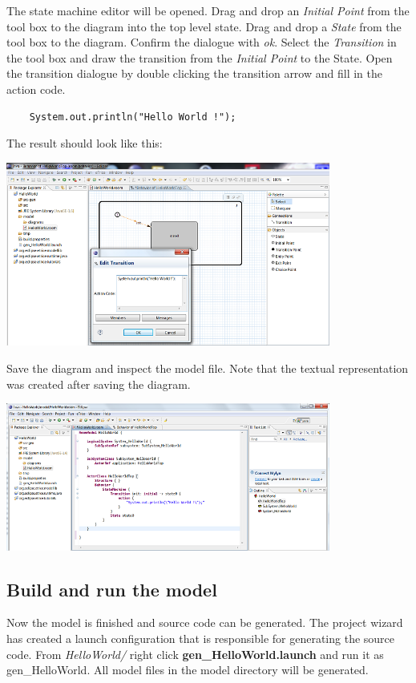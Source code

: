 The state machine editor will be opened. Drag and drop an \textit{Initial Point} from the tool box to the 
diagram into the top level state. Drag and drop a \textit{State} from the tool box to the diagram. Confirm 
the dialogue with \textit{ok}. Select the \textit{Transition} in the tool box and draw the transition from 
the \textit{Initial Point} to the State. Open the transition dialogue by double clicking the transition 
arrow and fill in the action code.

\begin{verbatim}
	System.out.println("Hello World !");
\end{verbatim}
 
The result should look like this:

\includegraphics[width=0.8\textwidth]{images/015-HelloWorld04.png}

Save the diagram and inspect the model file. Note that the textual representation was created after saving 
the diagram.

\includegraphics[width=0.8\textwidth]{images/015-HelloWorld05.png}


\subsection{Build and run the model}

Now the model is finished and source code can be generated. The project wizard has created a launch 
configuration that is responsible for generating the source code. From \textit{HelloWorld/} right click 
\textbf{gen\_HelloWorld.launch} and run it as gen\_HelloWorld. All model files in the model directory will 
be generated.

